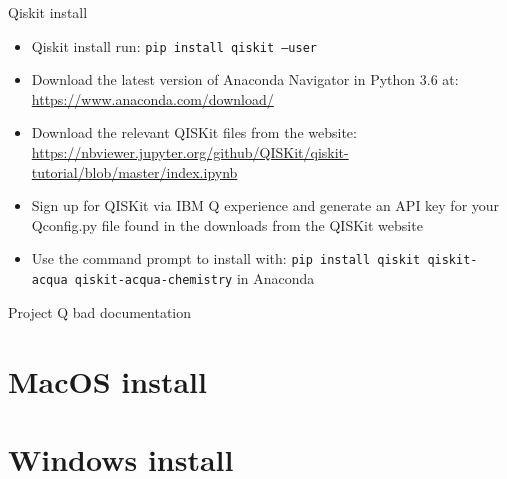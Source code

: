 Qiskit install
\begin{itemize}
    \item Qiskit install run: \texttt{pip install qiskit --user}
\end{itemize}
\begin{itemize}
    \item Download the latest version of Anaconda Navigator in Python 3.6 at: \url{https://www.anaconda.com/download/}
    \item Download the relevant QISKit files from the website: \url{https://nbviewer.jupyter.org/github/QISKit/qiskit-tutorial/blob/master/index.ipynb}
    \item Sign up for QISKit via IBM Q experience and generate an API key for your Qconfig.py file found in the downloads from the QISKit website 
    \item Use the command prompt to install with: \texttt{pip install qiskit qiskit-acqua qiskit-acqua-chemistry} in Anaconda
\end{itemize}

Project Q bad documentation 

\section{MacOS install}


\section{Windows install}

